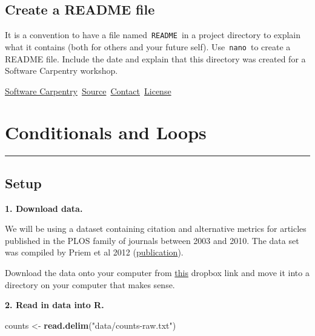 \documentclass[
]{book}
\newenvironment{Shaded}{\begin{snugshade}}{\end{snugshade}}
\newcommand{\KeywordTok}[1]{\textcolor[rgb]{0.13,0.29,0.53}{\textbf{#1}}}
\newcommand{\NormalTok}[1]{#1}
\newcommand{\StringTok}[1]{\textcolor[rgb]{0.31,0.60,0.02}{#1}}
\begin{document}
\hypertarget{create-a-readme-file}{%
\section{Create a README file}\label{create-a-readme-file}}

It is a convention to have a file named~\texttt{README}~in a project directory to explain what it contains (both for others and your future self). Use~\texttt{nano}~to create a README file. Include the date and explain that this directory was created for a Software Carpentry workshop.

\href{http://software-carpentry.org/}{Software Carpentry}~\href{https://github.com/jdblischak/r-intermediate-altmetrics}{Source}~\href{mailto:admin@software-carpentry.org}{Contact}~\href{https://jdblischak.github.io/r-intermediate-altmetrics/LICENSE.html}{License}

\hypertarget{conditionals-and-loops}{%
\chapter{Conditionals and Loops}\label{conditionals-and-loops}}

\begin{center}\rule{0.5\linewidth}{0.5pt}\end{center}

\hypertarget{setup}{%
\section{Setup}\label{setup}}

\textbf{1. Download data.}

We will be using a dataset containing citation and alternative metrics for articles published in the PLOS family of journals between 2003 and 2010. The data set was compiled by Priem et al 2012 (\href{http://arxiv.org/abs/1203.4745}{publication}).

Download the data onto your computer from \href{https://www.dropbox.com/s/up38z3fd4llanrb/counts-raw.txt?dl=0}{this} dropbox link and move it into a directory on your computer that makes sense.

\textbf{2. Read in data into R.}

\begin{Shaded}
\begin{Highlighting}[]
\NormalTok{counts <-}\StringTok{ }\KeywordTok{read.delim}\NormalTok{(}\StringTok{"data/counts-raw.txt"}\NormalTok{)}
\end{Highlighting}
\end{Shaded}
\end{document}
